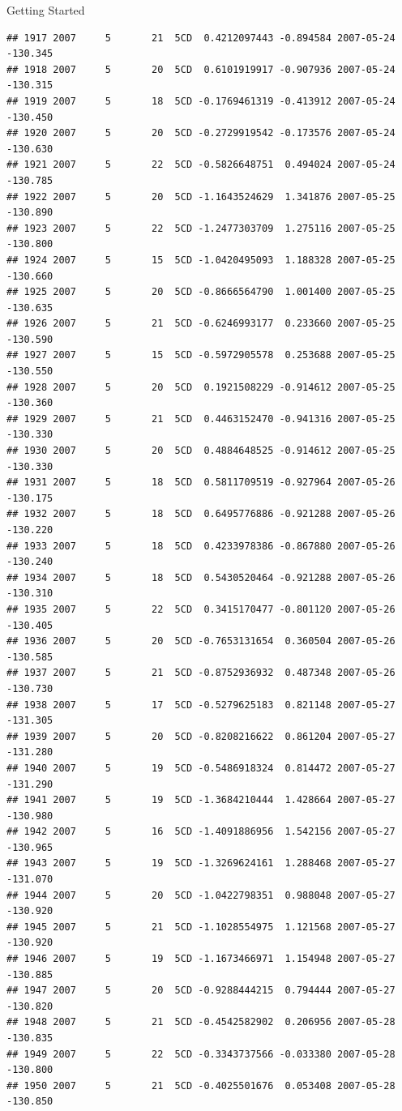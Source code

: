 \documentclass[
  ignorenonframetext,
]{beamer}
\begin{document}
\begin{frame}[fragile]{Getting Started}
\begin{verbatim}
## 1917 2007     5       21  5CD  0.4212097443 -0.894584 2007-05-24 -130.345
## 1918 2007     5       20  5CD  0.6101919917 -0.907936 2007-05-24 -130.315
## 1919 2007     5       18  5CD -0.1769461319 -0.413912 2007-05-24 -130.450
## 1920 2007     5       20  5CD -0.2729919542 -0.173576 2007-05-24 -130.630
## 1921 2007     5       22  5CD -0.5826648751  0.494024 2007-05-24 -130.785
## 1922 2007     5       20  5CD -1.1643524629  1.341876 2007-05-25 -130.890
## 1923 2007     5       22  5CD -1.2477303709  1.275116 2007-05-25 -130.800
## 1924 2007     5       15  5CD -1.0420495093  1.188328 2007-05-25 -130.660
## 1925 2007     5       20  5CD -0.8666564790  1.001400 2007-05-25 -130.635
## 1926 2007     5       21  5CD -0.6246993177  0.233660 2007-05-25 -130.590
## 1927 2007     5       15  5CD -0.5972905578  0.253688 2007-05-25 -130.550
## 1928 2007     5       20  5CD  0.1921508229 -0.914612 2007-05-25 -130.360
## 1929 2007     5       21  5CD  0.4463152470 -0.941316 2007-05-25 -130.330
## 1930 2007     5       20  5CD  0.4884648525 -0.914612 2007-05-25 -130.330
## 1931 2007     5       18  5CD  0.5811709519 -0.927964 2007-05-26 -130.175
## 1932 2007     5       18  5CD  0.6495776886 -0.921288 2007-05-26 -130.220
## 1933 2007     5       18  5CD  0.4233978386 -0.867880 2007-05-26 -130.240
## 1934 2007     5       18  5CD  0.5430520464 -0.921288 2007-05-26 -130.310
## 1935 2007     5       22  5CD  0.3415170477 -0.801120 2007-05-26 -130.405
## 1936 2007     5       20  5CD -0.7653131654  0.360504 2007-05-26 -130.585
## 1937 2007     5       21  5CD -0.8752936932  0.487348 2007-05-26 -130.730
## 1938 2007     5       17  5CD -0.5279625183  0.821148 2007-05-27 -131.305
## 1939 2007     5       20  5CD -0.8208216622  0.861204 2007-05-27 -131.280
## 1940 2007     5       19  5CD -0.5486918324  0.814472 2007-05-27 -131.290
## 1941 2007     5       19  5CD -1.3684210444  1.428664 2007-05-27 -130.980
## 1942 2007     5       16  5CD -1.4091886956  1.542156 2007-05-27 -130.965
## 1943 2007     5       19  5CD -1.3269624161  1.288468 2007-05-27 -131.070
## 1944 2007     5       20  5CD -1.0422798351  0.988048 2007-05-27 -130.920
## 1945 2007     5       21  5CD -1.1028554975  1.121568 2007-05-27 -130.920
## 1946 2007     5       19  5CD -1.1673466971  1.154948 2007-05-27 -130.885
## 1947 2007     5       20  5CD -0.9288444215  0.794444 2007-05-27 -130.820
## 1948 2007     5       21  5CD -0.4542582902  0.206956 2007-05-28 -130.835
## 1949 2007     5       22  5CD -0.3343737566 -0.033380 2007-05-28 -130.800
## 1950 2007     5       21  5CD -0.4025501676  0.053408 2007-05-28 -130.850

\end{verbatim}
\end{frame}
\end{document}
